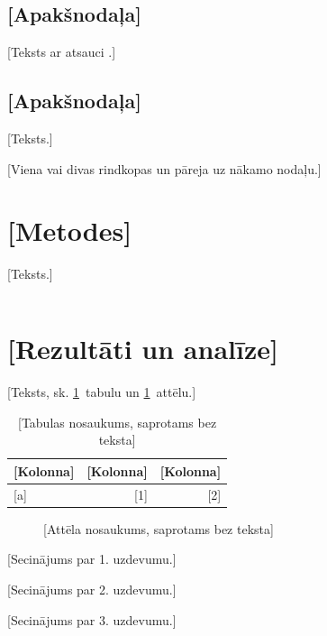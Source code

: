 \documentclass{zpd}
\begin{document}
\subsection{[Apakšnodaļa]}
[Teksts ar atsauci .]
\subsection{[Apakšnodaļa]}
[Teksts.]

[Viena vai divas rindkopas un pāreja uz nākamo nodaļu.]

\section{[Metodes]}
[Teksts.]

\begin{equation}
  [formula] \label{eq:piemers}
\end{equation}

\section{[Rezultāti un analīze]}
[Teksts, sk. \ref{tab:piemers}~tabulu un \ref{fig:piemers}~attēlu.]

\begin{table}[H]
  \caption{[Tabulas nosaukums, saprotams bez teksta]}\label{tab:piemers}
  \centering
  \begin{tabular}{lrr}
    \toprule
    {}[Kolonna] & [Kolonna] & [Kolonna] \\
    \midrule
    {}[a] & [1] & [2] \\
    \bottomrule
  \end{tabular}
\end{table}

\begin{figure}[H]
  \centering
  \fbox{\parbox[c][3cm][c]{8cm}{\centering [attēls]}}
  \caption{[Attēla nosaukums, saprotams bez teksta]}\label{fig:piemers}
\end{figure}

\begin{secinajumi}
  \item {}[Secinājums par 1. uzdevumu.]
  \item {}[Secinājums par 2. uzdevumu.]
  \item {}[Secinājums par 3. uzdevumu.]
\end{secinajumi}
\end{document}
